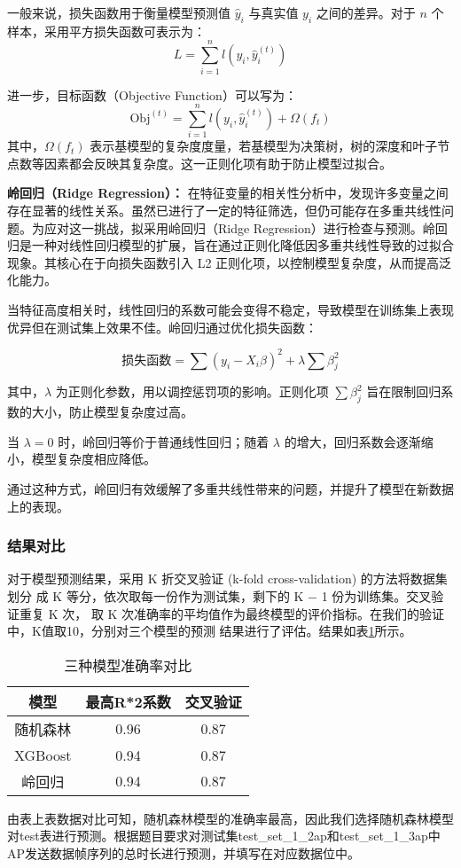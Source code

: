 \documentclass[bwprint]{gmcmthesis}
\begin{document}
 一般来说，损失函数用于衡量模型预测值 $\hat{y}_i$ 与真实值 $y_i$ 之间的差异。对于 $n$ 个样本，采用平方损失函数可表示为：
 \[
 L = \sum_{i=1}^{n} l(y_i, \hat{y}_i^{(t)})
 \]
 
 进一步，目标函数（Objective Function）可以写为：
 \[
 \text{Obj}^{(t)} = \sum_{i=1}^{n} l(y_i, \hat{y}_i^{(t)}) + \Omega(f_t)
 \]
 其中，$\Omega(f_t)$ 表示基模型的复杂度度量，若基模型为决策树，树的深度和叶子节点数等因素都会反映其复杂度。这一正则化项有助于防止模型过拟合。
 
 
 \textbf{岭回归（Ridge Regression）：}
 在特征变量的相关性分析中，发现许多变量之间存在显著的线性关系。虽然已进行了一定的特征筛选，但仍可能存在多重共线性问题。为应对这一挑战，拟采用岭回归（Ridge Regression）进行检查与预测。岭回归是一种对线性回归模型的扩展，旨在通过正则化降低因多重共线性导致的过拟合现象。其核心在于向损失函数引入 L2 正则化项，以控制模型复杂度，从而提高泛化能力。

 当特征高度相关时，线性回归的系数可能会变得不稳定，导致模型在训练集上表现优异但在测试集上效果不佳。岭回归通过优化损失函数：
 
 \[
 \text{损失函数} = \sum (y_i - X_i \beta)^2 + \lambda \sum \beta_j^2
 \]
 
 其中，$\lambda$ 为正则化参数，用以调控惩罚项的影响。正则化项 $\sum \beta_j^2$ 旨在限制回归系数的大小，防止模型复杂度过高。
 
 当 $\lambda = 0$ 时，岭回归等价于普通线性回归；随着 $\lambda$ 的增大，回归系数会逐渐缩小，模型复杂度相应降低。
 
 通过这种方式，岭回归有效缓解了多重共线性带来的问题，并提升了模型在新数据上的表现。
 
 \subsubsection{结果对比}
 对于模型预测结果，采用 K 折交叉验证 (k-fold cross-validation) 的方法将数据集划分
 成 K 等分，依次取每一份作为测试集，剩下的 K − 1 份为训练集。交叉验证重复 K 次，
 取 K 次准确率的平均值作为最终模型的评价指标。在我们的验证中，K值取10，分别对三个模型的预测
 结果进行了评估。结果如表\ref{tb:compare1}所示。

 \begin{table}[htp!]
    \centering
    
    \begin{tabular}{ccc}
      \hline %
      模型    &   最高R*2系数   &  交叉验证 \\
      \hline %
      随机森林       &   0.96   &  0.87\\
      \hline
      XGBoost       &    0.94 &  0.87\\
      \hline
      岭回归      &    0.94 &   0.87\\
      \hline
    \end{tabular}
    \vspace{0.5cm}
    \caption{三种模型准确率对比}
      \label{tb:compare1}
    \end{table}
 由表上表数据对比可知，随机森林模型的准确率最高，因此我们选择随机森林模型对test表进行预测。根据题目要求对测试集test\_set\_1\_2ap和test\_set\_1\_3ap中AP发送数据帧序列的总时长进行预测，并填写在对应数据位中。
 
\end{document}
